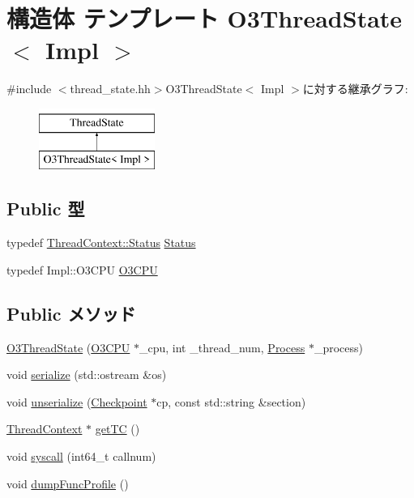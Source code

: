 \hypertarget{structO3ThreadState}{
\section{構造体 テンプレート O3ThreadState$<$ Impl $>$}
\label{structO3ThreadState}
}


{\ttfamily \#include $<$thread\_\-state.hh$>$}O3ThreadState$<$ Impl $>$に対する継承グラフ:\begin{figure}[H]
\begin{center}
\leavevmode
\includegraphics[height=2cm]{structO3ThreadState}
\end{center}
\end{figure}
\subsection*{Public 型}
\begin{DoxyCompactItemize}
\item 
typedef \hyperlink{classThreadContext_a67a0db04d321a74b7e7fcfd3f1a3f70b}{ThreadContext::Status} \hyperlink{structO3ThreadState_a3af29dcea6d2bbb0a1de56f02ec789f1}{Status}
\item 
typedef Impl::O3CPU \hyperlink{structO3ThreadState_a44622cf06940413482836cb62931ac3f}{O3CPU}
\end{DoxyCompactItemize}
\subsection*{Public メソッド}
\begin{DoxyCompactItemize}
\item 
\hyperlink{structO3ThreadState_ac155052720ec3adfe617a0bc7d5be7a0}{O3ThreadState} (\hyperlink{structO3ThreadState_a44622cf06940413482836cb62931ac3f}{O3CPU} $\ast$\_\-cpu, int \_\-thread\_\-num, \hyperlink{classProcess}{Process} $\ast$\_\-process)
\item 
void \hyperlink{structO3ThreadState_a53e036786d17361be4c7320d39c99b84}{serialize} (std::ostream \&os)
\item 
void \hyperlink{structO3ThreadState_af22e5d6d660b97db37003ac61ac4ee49}{unserialize} (\hyperlink{classCheckpoint}{Checkpoint} $\ast$cp, const std::string \&section)
\item 
\hyperlink{classThreadContext}{ThreadContext} $\ast$ \hyperlink{structO3ThreadState_a81894d15db5190d5364449a4915b76f5}{getTC} ()
\item 
void \hyperlink{structO3ThreadState_a36e0b96120fcbbc2ee8699158f7be5c2}{syscall} (int64\_\-t callnum)
\item 
void \hyperlink{structO3ThreadState_a13fa12d1779a94a1e0b968946a1367c7}{dumpFuncProfile} ()
\end{DoxyCompactItemize}
